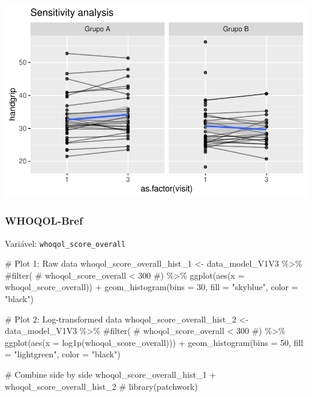 \documentclass[
  letterpaper,
  DIV=11,
  numbers=noendperiod]{scrartcl}
\newenvironment{Shaded}{\begin{snugshade}}{\end{snugshade}}
\newcommand{\AttributeTok}[1]{\textcolor[rgb]{0.40,0.45,0.13}{#1}}
\newcommand{\CommentTok}[1]{\textcolor[rgb]{0.37,0.37,0.37}{#1}}
\newcommand{\DecValTok}[1]{\textcolor[rgb]{0.68,0.00,0.00}{#1}}
\newcommand{\FunctionTok}[1]{\textcolor[rgb]{0.28,0.35,0.67}{#1}}
\newcommand{\NormalTok}[1]{\textcolor[rgb]{0.00,0.23,0.31}{#1}}
\newcommand{\OtherTok}[1]{\textcolor[rgb]{0.00,0.23,0.31}{#1}}
\newcommand{\SpecialCharTok}[1]{\textcolor[rgb]{0.37,0.37,0.37}{#1}}
\newcommand{\StringTok}[1]{\textcolor[rgb]{0.13,0.47,0.30}{#1}}
\begin{document}
\includegraphics{Outcomes_V1V2V3_files/figure-pdf/handgrip_6-2.pdf}

\subsubsection{WHOQOL-Bref}\label{whoqol-bref}

Variável: \texttt{whoqol\_score\_overall}

\begin{Shaded}
\begin{Highlighting}[]
\CommentTok{\# Plot 1: Raw data}
\NormalTok{whoqol\_score\_overall\_hist\_1 }\OtherTok{\textless{}{-}}\NormalTok{ data\_model\_V1V3 }\SpecialCharTok{\%\textgreater{}\%} 
    \CommentTok{\#filter(}
    \CommentTok{\#    whoqol\_score\_overall \textless{} 300}
    \CommentTok{\#) \%\textgreater{}\% }
    \FunctionTok{ggplot}\NormalTok{(}\FunctionTok{aes}\NormalTok{(}\AttributeTok{x =}\NormalTok{ whoqol\_score\_overall)) }\SpecialCharTok{+} 
    \FunctionTok{geom\_histogram}\NormalTok{(}\AttributeTok{bins =} \DecValTok{30}\NormalTok{, }\AttributeTok{fill =} \StringTok{"skyblue"}\NormalTok{, }\AttributeTok{color =} \StringTok{"black"}\NormalTok{)}

\CommentTok{\# Plot 2: Log{-}transformed data}
\NormalTok{whoqol\_score\_overall\_hist\_2 }\OtherTok{\textless{}{-}}\NormalTok{ data\_model\_V1V3 }\SpecialCharTok{\%\textgreater{}\%} 
    \CommentTok{\#filter(}
    \CommentTok{\#    whoqol\_score\_overall \textless{} 300}
    \CommentTok{\#) \%\textgreater{}\%}
    \FunctionTok{ggplot}\NormalTok{(}\FunctionTok{aes}\NormalTok{(}\AttributeTok{x =} \FunctionTok{log1p}\NormalTok{(whoqol\_score\_overall))) }\SpecialCharTok{+} 
    \FunctionTok{geom\_histogram}\NormalTok{(}\AttributeTok{bins =} \DecValTok{50}\NormalTok{, }\AttributeTok{fill =} \StringTok{"lightgreen"}\NormalTok{, }\AttributeTok{color =} \StringTok{"black"}\NormalTok{)}

\CommentTok{\# Combine side by side}
\NormalTok{whoqol\_score\_overall\_hist\_1 }\SpecialCharTok{+}\NormalTok{ whoqol\_score\_overall\_hist\_2 }\CommentTok{\# library(patchwork)}
\end{Highlighting}
\end{Shaded}
\end{document}
